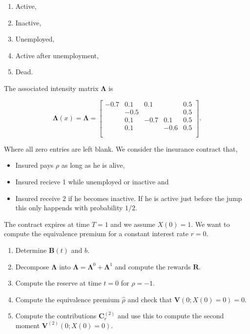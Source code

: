 \documentclass[
]{book}
\providecommand{\tightlist}{%
  \setlength{\itemsep}{0pt}\setlength{\parskip}{0pt}}
\begin{document}
\begin{enumerate}
\def\labelenumi{\arabic{enumi}.}
\tightlist
\item
  Active,
\item
  Inactive,
\item
  Unemployed,
\item
  Active after unemployment,
\item
  Dead.
\end{enumerate}

The associated intensity matrix \(\mathbf \Lambda\) is

\[
\mathbf\Lambda(x)=\mathbf \Lambda=
\begin{bmatrix}
-0.7 & 0.1 & 0.1&    &0.5 \\
 &-0.5 &  &  & 0.5 \\
 & 0.1& -0.7 & 0.1 & 0.5\\
 & 0.1 & & -0.6 & 0.5\\
 &  &  &  & \\
\end{bmatrix}.
\]

Where all zero entries are left blank. We consider the insurance contract that,

\begin{itemize}
\tightlist
\item
  Insured pays \(\rho\) as long as he is alive,
\item
  Insured recieve 1 while unemployed or inactive and
\item
  Insured receive 2 if he becomes inactive. If he is active just before the jump this only happends with probability \(1/2\).
\end{itemize}

The contract expires at time \(T=1\) and we assume \(X(0)=1\). We want to compute the equivalence premium for a constant interest rate \(r=0\).

\begin{enumerate}
\def\labelenumi{\alph{enumi}.}
\tightlist
\item
  Determine \(\mathbf B(t)\) and \(b\).
\item
  Decompose \(\mathbf \Lambda\) into \(\mathbf \Lambda=\mathbf \Lambda^0+\mathbf \Lambda^1\) and compute the rewards \(\mathbf R\).
\item
  Compute the reserve at time \(t=0\) for \(\rho = -1\).
\item
  Compute the equivalence premium \(\hat\rho\) and check that \(\mathbf V(0;X(0)=0)=0\).
\item
  Compute the contributions \(\mathbf C_r^{(2)}\) and use this to compute the second moment \(\mathbf V^{(2)}(0;X(0)=0)\).
\end{enumerate}
\end{document}
